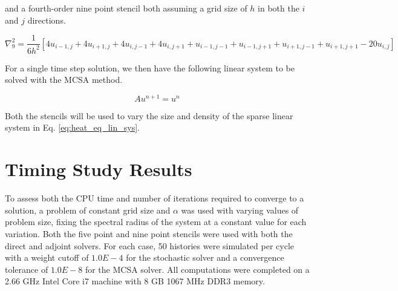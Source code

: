 \documentclass[note]{TechNote}
\begin{document}
and a fourth-order nine point stencil both assuming a grid size of $h$
in both the $i$ and $j$ directions.

\begin{equation}
  \nabla^2_9 = \frac{1}{6h^2}[4 u_{i-1,j} + 4 u_{i+1,j} + 4 u_{i,j-1}
    + 4 u_{i,j+1} + u_{i-1,j-1} + u_{i-1,j+1} + u_{i+1,j-1} +
    u_{i+1,j+1} - 20 u_{i,j}]
  \label{eq:nine_point_stencil}
\end{equation}

For a single time step solution, we then have the following linear
system to be solved with the MCSA method.

\begin{equation}
  A u^{n+1} = u^n
  \label{eq:heat_eq_lin_sys}
\end{equation}

Both the stencils will be used to vary the size and density of the
sparse linear system in Eq. \ref{eq:heat_eq_lin_sys}.

\section{Timing Study Results}
To assess both the CPU time and number of iterations required to
converge to a solution, a problem of constant grid size and $\alpha$
was used with varying values of problem size, fixing the spectral
radius of the system at a constant value for each variation. Both the
five point and nine point stencils were used with both the direct and
adjoint solvers. For each case, 50 histories were simulated per cycle
with a weight cutoff of $1.0E-4$ for the stochastic solver and a
convergence tolerance of $1.0E-8$ for the MCSA solver. All
computations were completed on a 2.66 GHz Intel Core i7 machine with 8
GB 1067 MHz DDR3 memory.
\end{document}
